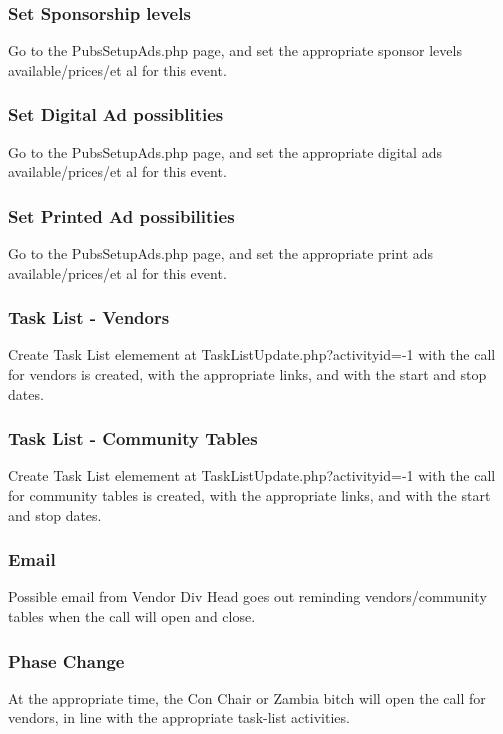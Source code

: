 \documentclass[captions=tablesignature]{scrartcl}
\begin{document}
\subsubsection{Set Sponsorship levels}
\label{sec-3-2-3}
Go to the PubsSetupAds.php page, and set the
appropriate sponsor levels available/prices/et al for this event.

\subsubsection{Set Digital Ad possiblities}
\label{sec-3-2-4}
Go to the PubsSetupAds.php page, and set the
appropriate digital ads available/prices/et al for this event.

\subsubsection{Set Printed Ad possibilities}
\label{sec-3-2-5}
Go to the PubsSetupAds.php page, and set the
appropriate print ads available/prices/et al for this event.

\subsubsection{Task List - Vendors}
\label{sec-3-2-6}
Create Task List elemement at TaskListUpdate.php?activityid=-1
with the call for vendors is created, with the appropriate links,
and with the start and stop dates.

\subsubsection{Task List - Community Tables}
\label{sec-3-2-7}
Create Task List elemement at TaskListUpdate.php?activityid=-1
with the call for community tables is created, with the
appropriate links, and with the start and stop dates.

\subsubsection{Email}
\label{sec-3-2-8}
Possible email from Vendor Div Head goes out reminding
vendors/community tables when the call will open and close.

\subsubsection{Phase Change}
\label{sec-3-2-9}
At the appropriate time, the Con Chair or Zambia bitch will open
the call for vendors, in line with the appropriate task-list
activities.
\end{document}
